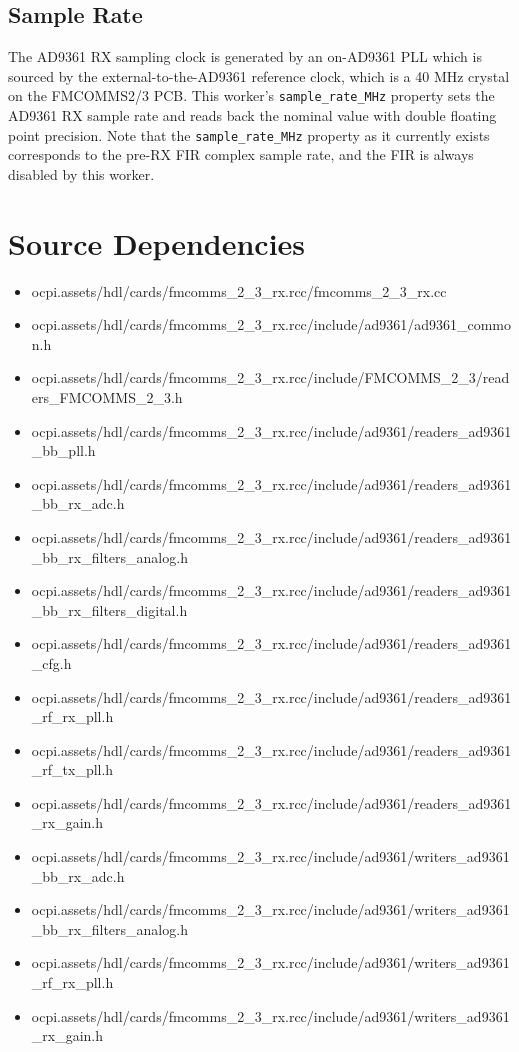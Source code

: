 \documentclass{article}
\begin{document}
\subsection*{Sample Rate}
The AD9361 RX sampling clock is generated by an on-AD9361 PLL which is sourced by the external-to-the-AD9361 reference clock, which is a 40 MHz crystal on the FMCOMMS2/3 PCB. This worker's \verb+sample_rate_MHz+ property sets the AD9361 RX sample rate and reads back the nominal value with double floating point precision. Note that the \verb+sample_rate_MHz+ property as it currently exists corresponds to the pre-RX FIR complex sample rate, and the FIR is always disabled by this worker.

\newpage

\section*{Source Dependencies}
\begin{itemize}
	\item ocpi.assets/hdl/cards/fmcomms\_2\_3\_rx.rcc/fmcomms\_2\_3\_rx.cc
	\item ocpi.assets/hdl/cards/fmcomms\_2\_3\_rx.rcc/include/ad9361/ad9361\_common.h
	\item ocpi.assets/hdl/cards/fmcomms\_2\_3\_rx.rcc/include/FMCOMMS\_2\_3/readers\_FMCOMMS\_2\_3.h
	\item ocpi.assets/hdl/cards/fmcomms\_2\_3\_rx.rcc/include/ad9361/readers\_ad9361\_bb\_pll.h
	\item ocpi.assets/hdl/cards/fmcomms\_2\_3\_rx.rcc/include/ad9361/readers\_ad9361\_bb\_rx\_adc.h
	\item ocpi.assets/hdl/cards/fmcomms\_2\_3\_rx.rcc/include/ad9361/readers\_ad9361\_bb\_rx\_filters\_analog.h
	\item ocpi.assets/hdl/cards/fmcomms\_2\_3\_rx.rcc/include/ad9361/readers\_ad9361\_bb\_rx\_filters\_digital.h
	\item ocpi.assets/hdl/cards/fmcomms\_2\_3\_rx.rcc/include/ad9361/readers\_ad9361\_cfg.h
	\item ocpi.assets/hdl/cards/fmcomms\_2\_3\_rx.rcc/include/ad9361/readers\_ad9361\_rf\_rx\_pll.h
	\item ocpi.assets/hdl/cards/fmcomms\_2\_3\_rx.rcc/include/ad9361/readers\_ad9361\_rf\_tx\_pll.h
	\item ocpi.assets/hdl/cards/fmcomms\_2\_3\_rx.rcc/include/ad9361/readers\_ad9361\_rx\_gain.h
	\item ocpi.assets/hdl/cards/fmcomms\_2\_3\_rx.rcc/include/ad9361/writers\_ad9361\_bb\_rx\_adc.h
	\item ocpi.assets/hdl/cards/fmcomms\_2\_3\_rx.rcc/include/ad9361/writers\_ad9361\_bb\_rx\_filters\_analog.h
	\item ocpi.assets/hdl/cards/fmcomms\_2\_3\_rx.rcc/include/ad9361/writers\_ad9361\_rf\_rx\_pll.h
	\item ocpi.assets/hdl/cards/fmcomms\_2\_3\_rx.rcc/include/ad9361/writers\_ad9361\_rx\_gain.h
\end{itemize}
\end{document}
